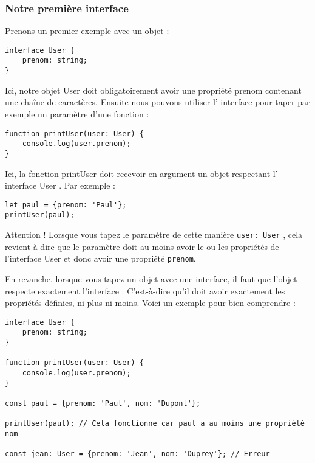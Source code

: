 \subsubsection{Notre première interface}
Prenons un premier exemple avec un objet :
\begin{verbatim}
interface User {
    prenom: string;
}
\end{verbatim}

Ici, notre objet {\color{monOrange}User} doit obligatoirement avoir une propriété {\color{blue}prenom} contenant une chaîne de caractères. Ensuite nous pouvons utiliser l' interface pour taper par exemple un paramètre d'une fonction :
\begin{verbatim}
function printUser(user: User) {
    console.log(user.prenom);
}
\end{verbatim}

Ici, la fonction {\color{blue}printUser} doit recevoir en argument un objet respectant l' interface {\color{monOrange}User} . Par exemple :
\begin{verbatim}
let paul = {prenom: 'Paul'};
printUser(paul);
\end{verbatim}

Attention ! Lorsque vous tapez le paramètre de cette manière {\tt user: User} , cela revient à dire que le paramètre doit au moins avoir le ou les propriétés de l'interface {\color{blue}User} et donc avoir une propriété {\tt prenom}.

En revanche, lorsque vous tapez un objet avec une interface, il faut que l'objet respecte exactement l'interface . C'est-à-dire qu'il doit avoir exactement les propriétés définies, ni plus ni moins. Voici un exemple pour bien comprendre :
\begin{verbatim}
interface User {
    prenom: string;
}

function printUser(user: User) {
    console.log(user.prenom);
}

const paul = {prenom: 'Paul', nom: 'Dupont'};

printUser(paul); // Cela fonctionne car paul a au moins une propriété nom

const jean: User = {prenom: 'Jean', nom: 'Duprey'}; // Erreur
\end{verbatim}


